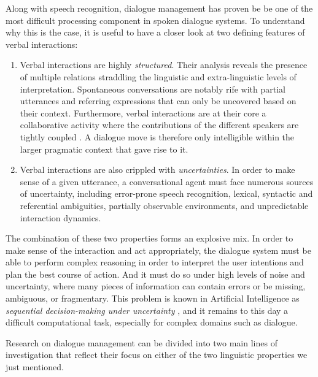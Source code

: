 Along with speech recognition, dialogue management has proven be be one of the most difficult processing component in spoken dialogue systems. To understand why this is the case, it is useful to have a closer look at two defining features of verbal interactions:
\begin{enumerate}
\item Verbal interactions are highly \textit{structured}.  Their analysis reveals the presence of multiple relations straddling the linguistic and extra-linguistic levels of interpretation. Spontaneous conversations are notably rife with partial utterances and referring expressions that can only be uncovered based on their context. Furthermore, verbal interactions are at their core a  collaborative activity where the contributions of the different speakers are tightly coupled \citep{Clark96,Garrod2004}. A dialogue move is therefore only intelligible within the larger pragmatic context that gave rise to it. 

\item Verbal interactions are also crippled with \textit{uncertainties}.  In order to make sense of a given utterance, a conversational agent must face numerous sources of uncertainty, including error-prone speech recognition, lexical,  syntactic and referential ambiguities, partially observable environments, and unpredictable interaction dynamics.  
\end{enumerate} 

The combination of these two properties forms an explosive mix.  In order to make sense of the interaction and act appropriately, the dialogue system must be able to perform complex reasoning in order to interpret the user intentions and plan the best course of action.  And it must do so under high levels of noise and uncertainty, where many pieces of information can contain errors or be missing, ambiguous, or fragmentary. This problem is known in Artificial Intelligence as \textit{sequential decision-making under uncertainty} \citep{Kaelbling:1998,aima2010}, and it remains to this day a difficult computational task, especially for complex domains such as dialogue. 

Research on dialogue management can be divided into two main lines of investigation that reflect their focus on either of the two linguistic properties we just mentioned.  

